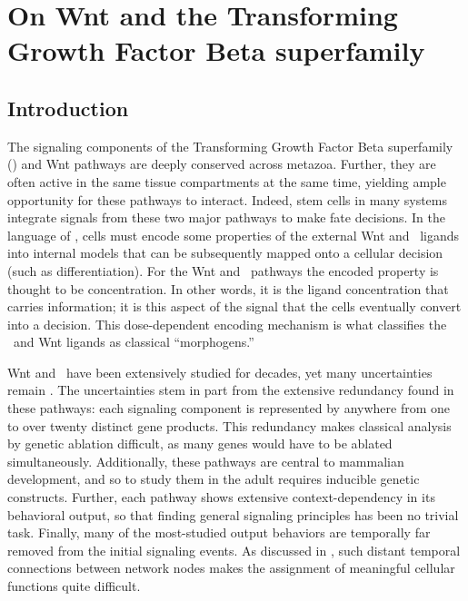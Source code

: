 \chapter[On Wnt and the TGFB superfamily]{On Wnt and the Transforming Growth Factor Beta superfamily}
\label{pathways:introduction}

\section{Introduction}


The signaling components of the 
Transforming Growth Factor Beta 
superfamily (\tgfbsf) and Wnt pathways are deeply conserved across metazoa.
Further, they are often active in the same
tissue compartments at the same time, yielding ample opportunity
for these pathways to interact.
Indeed, stem cells in many systems integrate signals from
these two major pathways to make fate decisions. In the language
of , cells must encode some
properties of the external Wnt and \tgfbsf\ ligands into internal models
that can be subsequently mapped onto a cellular decision (such as differentiation).
For the Wnt and \tgfbsf\ pathways the encoded property
is thought to be concentration. In other words,
it is the ligand concentration that carries information; it
is this aspect of the signal that the cells eventually convert into a decision.
This dose-dependent
encoding mechanism is what classifies the \tgfbsf\ and Wnt ligands as
classical ``morphogens.''


Wnt and \tgfbsf\ have been extensively studied for decades, yet many
uncertainties remain \cite{Li2012,Hernandez2012,Massague2012}.
The uncertainties stem in part from the extensive redundancy
found in these pathways: each signaling component is represented by
anywhere from
one to over twenty distinct gene products. This redundancy makes classical
analysis by genetic ablation difficult, as many genes would have to be
ablated simultaneously. Additionally, these pathways are central to
mammalian development, and so to study them in the adult requires
inducible genetic constructs. Further, each pathway shows extensive
context-dependency in its behavioral output, so that finding general 
signaling principles has been no trivial task. Finally, 
many of the most-studied output behaviors
are temporally far removed from the initial signaling
events. As discussed in , such distant
temporal connections between network nodes makes the assignment of
meaningful cellular functions quite difficult.


